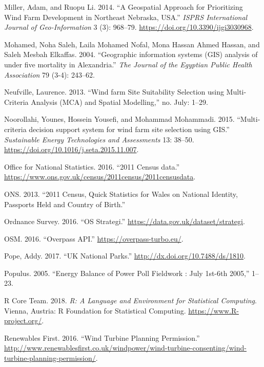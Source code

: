 \documentclass[a4paper,]{article}
\theoremstyle{definition}
\theoremstyle{definition}
\theoremstyle{definition}
\theoremstyle{remark}
\begin{document}
\leavevmode\hypertarget{ref-Miller2014}{}%
Miller, Adam, and Ruopu Li. 2014. ``A Geospatial Approach for
Prioritizing Wind Farm Development in Northeast Nebraska, USA.''
\emph{ISPRS International Journal of Geo-Information} 3 (3): 968--79.
\url{https://doi.org/10.3390/ijgi3030968}.

\leavevmode\hypertarget{ref-Mohamed2004}{}%
Mohamed, Noha Saleh, Laila Mohamed Nofal, Mona Hassan Ahmed Hassan, and
Saleh Mesbah Elkaffas. 2004. ``Geographic information systems (GIS)
analysis of under five mortality in Alexandria.'' \emph{The Journal of
the Egyptian Public Health Association} 79 (3-4): 243--62.

\leavevmode\hypertarget{ref-Neufville2013}{}%
Neufville, Laurence. 2013. ``Wind farm Site Suitability Selection using
Multi-Criteria Analysis (MCA) and Spatial Modelling,'' no. July: 1--29.

\leavevmode\hypertarget{ref-Noorollahi2015}{}%
Noorollahi, Younes, Hossein Yousefi, and Mohammad Mohammadi. 2015.
``Multi-criteria decision support system for wind farm site selection
using GIS.'' \emph{Sustainable Energy Technologies and Assessments} 13:
38--50. \url{https://doi.org/10.1016/j.seta.2015.11.007}.

\leavevmode\hypertarget{ref-OfficeforNationalStatistics}{}%
Office for National Statistics. 2016. ``2011 Census data.''
\url{https://www.ons.gov.uk/census/2011census/2011censusdata}.

\leavevmode\hypertarget{ref-ONS2013}{}%
ONS. 2013. ``2011 Census, Quick Statistics for Wales on National
Identity, Passports Held and Country of Birth.''

\leavevmode\hypertarget{ref-Survey2016}{}%
Ordnance Survey. 2016. ``OS Strategi.''
\url{https://data.gov.uk/dataset/strategi}.

\leavevmode\hypertarget{ref-Overpass2016}{}%
OSM. 2016. ``Overpass API.'' \url{https://overpass-turbo.eu/}.

\leavevmode\hypertarget{ref-Pope2017}{}%
Pope, Addy. 2017. ``UK National Parks.''
\url{http://dx.doi.org/10.7488/ds/1810}.

\leavevmode\hypertarget{ref-Populus2005}{}%
Populus. 2005. ``Energy Balance of Power Poll Fieldwork : July 1st-6th
2005,'' 1--23.

\leavevmode\hypertarget{ref-R-base}{}%
R Core Team. 2018. \emph{R: A Language and Environment for Statistical
Computing}. Vienna, Austria: R Foundation for Statistical Computing.
\url{https://www.R-project.org/}.

\leavevmode\hypertarget{ref-RF2016}{}%
Renewables First. 2016. ``Wind Turbine Planning Permission.''
\url{http://www.renewablesfirst.co.uk/windpower/wind-turbine-consenting/wind-turbine-planning-permission/}.
\end{document}
